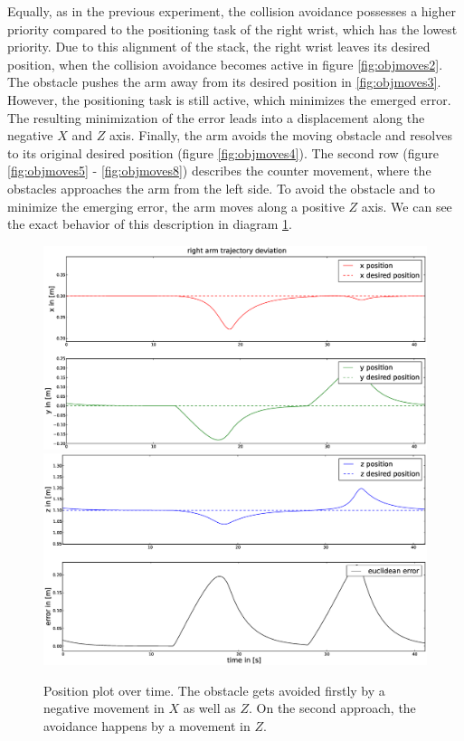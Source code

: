 Equally, as in the previous experiment, the collision avoidance possesses a higher priority compared to the positioning task of the right wrist, which has the lowest priority. Due to this alignment of the stack, the right wrist leaves its desired position, when the collision avoidance becomes active in figure \ref{fig:objmoves2}. The obstacle pushes the arm away from its desired position in \ref{fig:objmoves3}. However, the positioning task is still active, which minimizes the emerged error. The resulting minimization of the error leads into a displacement along the negative $X$ and $Z$ axis. Finally, the arm avoids the moving obstacle and resolves to its original desired position (figure \ref{fig:objmoves4}). 
\newpage
The second row (figure \ref{fig:objmoves5} - \ref{fig:objmoves8}) describes the counter movement, where the obstacles approaches the arm from the left side. To avoid the obstacle and to minimize the emerging error, the arm moves along a positive $Z$ axis. We can see the exact behavior of this description in diagram \ref{fig:objmovesposition}. 
\begin{figure}
  \centering
    \includegraphics[width=\textwidth]{../figures/object_moves/position1.eps}
    \includegraphics[width=\textwidth]{../figures/object_moves/position2.eps}
    \caption{Position plot over time. The obstacle gets avoided firstly by a negative movement in $X$ as well as $Z$. On the second approach, the avoidance happens by a movement in $Z$.}
    \label{fig:objmovesposition}
\end{figure}

